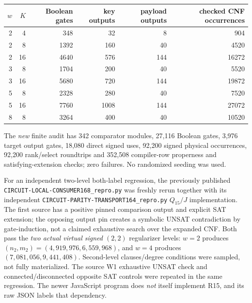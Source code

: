 \documentclass[11pt]{article}
\begin{document}
\begin{center}\small
\begin{tabular}{rrrrrr}
\toprule
$w$&$K$&Boolean gates&key outputs&payload outputs&
checked CNF occurrences\\
\midrule
2&4&348&32&8&904\\
2&8&1392&160&40&4520\\
2&16&4640&576&144&16272\\
3&8&1704&200&40&5520\\
3&16&5680&720&144&19872\\
5&8&2328&280&40&7520\\
5&16&7760&1008&144&27072\\
8&8&3264&400&40&10520\\
\bottomrule
\end{tabular}
\end{center}
The \emph{new} finite audit has 342 comparator modules,
27,116 Boolean gates, 3,976 target output gates,
18,080 direct signed uses, 92,200 signed physical
occurrences, 92,200 rank/select roundtrips and
352,508 compiler-row properness and satisfying-extension
checks; zero failures. No randomized seeding was used.

For an independent two-level both-label regression,
the previously published
\texttt{CIRCUIT-LOCAL-CONSUMER168\_repro.py}
was freshly rerun together with its independent
\texttt{CIRCUIT-PARITY-TRANSPORT164\_repro.py}
$Q_{15}/J$ implementation. The first source has a
positive pinned comparison output and explicit SAT
extension; the opposing output pin creates a symbolic
UNSAT contradiction by gate-induction, not a claimed
exhaustive search over the expanded CNF. Both pass
the \emph{two actual virtual signed $(2,2)$}
regularizer levels: $w=2$ produces
$(n_2,m_2)=(4{,}919{,}976,6{,}559{,}968)$, and
$w=4$ produces $(7{,}081{,}056,9{,}441{,}408)$.
Second-level clauses/degree conditions were sampled,
not fully materialized. The source W1 exhaustive
UNSAT check and connected/disconnected opposite
SAT controls were repeated in the same regression.
The newer JavaScript program does \emph{not} itself
implement R15, and its raw JSON labels that dependency.
\end{document}
